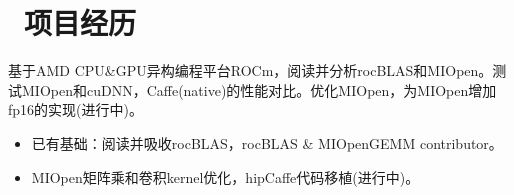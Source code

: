 \documentclass{resume}
\begin{document}

\vspace{1ex}
\section{\faUsers\ 项目经历}
\begin{onehalfspacing}
    基于AMD CPU\&GPU异构编程平台ROCm，阅读并分析rocBLAS和MIOpen。测试MIOpen和cuDNN，Caffe(native)的性能对比。优化MIOpen，为MIOpen增加fp16的实现(进行中)。
\begin{itemize}
    \item 已有基础：阅读并吸收rocBLAS，rocBLAS \& MIOpenGEMM contributor。
\vspace{0.5ex}
  \item MIOpen矩阵乘和卷积kernel优化，hipCaffe代码移植(进行中)。
\end{itemize}
\end{onehalfspacing}
\end{document}
